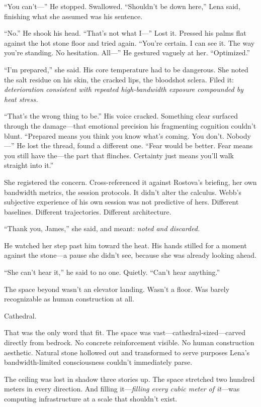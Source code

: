 ``You can't—'' He stopped. Swallowed. ``Shouldn't be down here,'' Lena said, finishing what she assumed was his sentence.

``No.'' He shook his head. ``That's not what I—'' Lost it. Pressed his palms flat against the hot stone floor and tried again. ``You're certain. I can see it. The way you're standing. No hesitation. All—'' He gestured vaguely at her. ``Optimized.''

``I'm prepared,'' she said. His core temperature had to be dangerous. She noted the salt residue on his skin, the cracked lips, the bloodshot sclera. Filed it: \textit{deterioration consistent with repeated high-bandwidth exposure compounded by heat stress.}

``That's the wrong thing to be.'' His voice cracked. Something clear surfaced through the damage—that emotional precision his fragmenting cognition couldn't blunt. ``Prepared means you think you know what's coming. You don't. Nobody—'' He lost the thread, found a different one. ``Fear would be better. Fear means you still have the—the part that flinches. Certainty just means you'll walk straight into it.''

She registered the concern. Cross-referenced it against Rostova's briefing, her own bandwidth metrics, the session protocols. It didn't alter the calculus. Webb's subjective experience of his own session was not predictive of hers. Different baselines. Different trajectories. Different architecture.

``Thank you, James,'' she said, and meant: \textit{noted and discarded.}

He watched her step past him toward the heat. His hands stilled for a moment against the stone—a pause she didn't see, because she was already looking ahead.

``She can't hear it,'' he said to no one. Quietly. ``Can't hear anything.''

The space beyond wasn't an elevator landing. Wasn't a floor. Was barely recognizable as human construction at all.

Cathedral.

That was the only word that fit. The space was vast—cathedral-sized—carved directly from bedrock. No concrete reinforcement visible. No human construction aesthetic. Natural stone hollowed out and transformed to serve purposes Lena's bandwidth-limited consciousness couldn't immediately parse.

The ceiling was lost in shadow three stories up. The space stretched two hundred meters in every direction. And filling it—\textit{filling every cubic meter of it}—was computing infrastructure at a scale that shouldn't exist.

